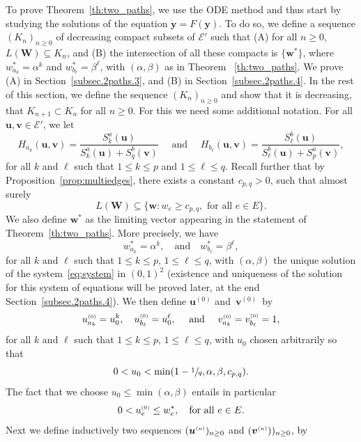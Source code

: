 \documentclass[10pt]{amsart}
\let\mathcal\mathscr
\let \nicefrac\sfrac
\newcommand{\bW}{\boldsymbol{W}}
\numberwithin{equation}{section}
\theoremstyle{definition}
\let\bs\boldsymbol
\newcommand{\sss}{\ensuremath{\scriptscriptstyle}}
\begin{document}
To prove Theorem~\ref{th:two_paths}, we use the ODE method and thus start by studying the solutions of the equation ${\bs{\dot y}} =F({\bs y})$. To do so, we define a sequence $(K_n)_{n\geq 0}$ of decreasing compact subsets of $\mathcal E'$ such that (A) for all $n\geq 0$, $L(\bW)\subseteq K_n$, and (B) the intersection of all these compacts is $\{\bs w^*\}$, where $w_{a_k}^* = \alpha^k$ and $w_{b_\ell}^* = \beta^\ell$, with $(\alpha, \beta)$ as in Theorem ~\ref{th:two_paths}.
We prove (A) in Section~\eqref{subsec.2paths.3}, and (B) in Section~\ref{subsec.2paths.4}.
In the rest of this section, we define the sequence $(K_n)_{n\geq 0}$ and show that it is decreasing,
\ie that $K_{n+1} \subset K_n$ for all $n\ge 0$.
For this we need some additional notation.
For all $\bs u,\bs v \in \mathcal E'$, we let
\[
H_{a_k}(\bs u,\bs v)
= \frac{S^a_k(\bs u)}{S^a_k(\bs u)+S^b_q(\bs v)}
\quad\text{ and }\quad
H_{b_\ell}(\bs u,\bs v)
= \frac{S^b_\ell(\bs u)}{S^b_\ell(\bs u)+S^a_p(\bs v)},
\]
for all $k$ and $\ell$ such that $1\leq k\leq p$ and $1\leq \ell\leq q$.
Recall further that by Proposition~\ref{prop:multiedges}, there exists a constant $c_{p,q}>0$, such that almost surely
\begin{equation}\label{K0def}
L(\bW) \subseteq \{\bs w\colon w_e\ge c_{p,q}, \text{ for all }e\in E\}.
\end{equation}
{We also define $\bs w^*$ as the limiting vector appearing in the statement of Theorem~\ref{th:two_paths}. More precisely, we have }
\begin{equation}\label{w*}
{w_{a_k}^* = \alpha^k, \quad \text{and} \quad w_{b_\ell}^* = \beta^\ell,}
\end{equation}
{for all $k$ and $\ell$ such that  $1\le k\le p$, $1\le \ell \le q$, with $(\alpha,\beta)$ the unique solution of the system~\eqref{eq:system} in $(0,1)^2$ (existence and {uniqueness} of the solution for this system of equations will be proved later, at the end Section~\ref{subsec.2paths.4}).}
We then define $\bs u^{(0)}$ and~$\bs v^{(0)}$~by
\[
u^{\sss (0)}_{a_k}=u_0^k, \quad
u^{\sss (0)}_{b_\ell}=u_0^\ell,\quad \text{ and }\quad
v^{\sss (0)}_{a_k}=v^{\sss (0)}_{b_\ell}=1,
\]
for all $k$ and $\ell$ such that  $1\le k\le p$, $1\le \ell \le q$, with $u_0$ chosen arbitrarily so that
\[
0< u_0<\min(1-\nicefrac1q,\alpha,\beta,c_{p,q}).
\]
The fact that we choose $u_0\le \min(\alpha,\beta)$ entails in particular
\[
0< u^{\sss (0)}_e\leq w^*_e, \quad \text{for all }e\in E.
\]
Next we define inductively two sequences $(\bs u^{\sss (n)})_{n\ge 0}$ and $(\bs v^{\sss (n)}))_{n\ge 0}$, by
\end{document}
